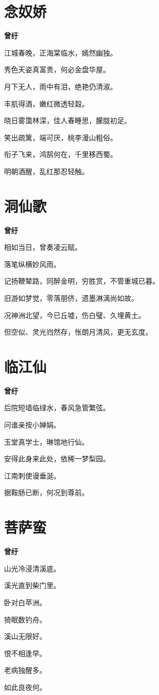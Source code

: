 \documentclass[12pt,a4paper]{ctexbook}
\begin{document}
\section{念奴娇}
\textbf{曾纡}\par\vspace{0.5em}
江城春晚，正海棠临水，嫣然幽独。\par
秀色天姿真富贵，何必金盘华屋。\par
月下无人，雨中有泪，绝艳仍清淑。\par
丰肌得酒，嫩红微透轻縠。\par
晓日雾霭林深，佳人春睡思，朦胧初足。\par
笑出疏篱，端可厌，桃李漫山粗俗。\par
衔子飞来，鸿鹄何在，千里移西蜀。\par
明朝酒醒，乱红那忍轻触。\par

\section{洞仙歌}
\textbf{曾纡}\par\vspace{0.5em}
相如当日，曾奏凌云赋。\par
落笔纵横妙风雨。\par
记扬鞭辇路，同醉金明，穷胜赏，不管重城已暮。\par
旧游如梦觉，零落朋侪，遗墨淋漓尚如故。\par
况神洲北望，今已丘墟，伤白璧、久埋黄土。\par
但空似、灵光岿然存，怅朗月清风，更无玄度。\par

\section{临江仙}
\textbf{曾纡}\par\vspace{0.5em}
后院短墙临绿水，春风急管繁弦。\par
问谁亲按小婵娟。\par
玉堂真学士，琳馆地行仙。\par
安得此身来此处，依稀一梦梨园。\par
江南刺使谩垂涎。\par
据鞍肠已断，何况到尊前。\par

\section{菩萨蛮}
\textbf{曾纡}\par\vspace{0.5em}
山光冷浸清溪底。\par
溪光直到柴门里。\par
卧对白苹洲。\par
猗眠数钓舟。\par
溪山无限好。\par
恨不相逢早。\par
老病独醒多。\par
如此良夜何。\par
\end{document}
